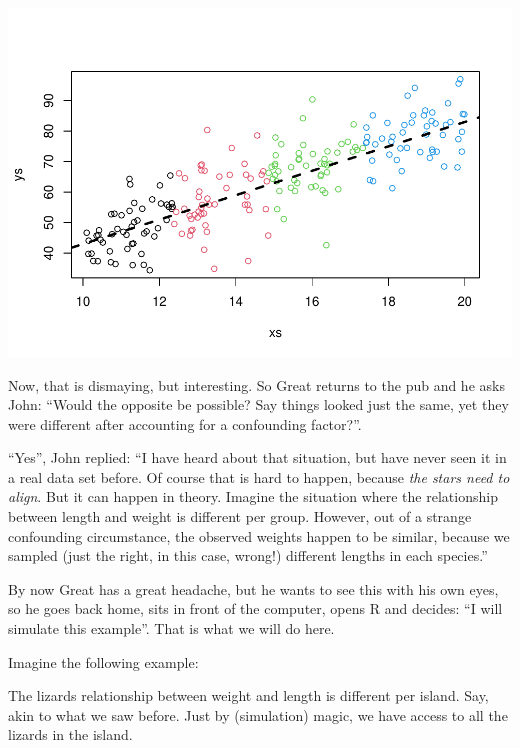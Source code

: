 \documentclass[
]{book}
\begin{document}
\includegraphics{ECOMODbook_files/figure-latex/a10.8-1.pdf}

Now, that is dismaying, but interesting. So Great returns to the pub and he asks John: ``Would the opposite be possible? Say things looked just the same, yet they were different after accounting for a confounding factor?''.

``Yes'', John replied: ``I have heard about that situation, but have never seen it in a real data set before. Of course that is hard to happen, because \emph{the stars need to align}. But it can happen in theory. Imagine the situation where the relationship between length and weight is different per group. However, out of a strange confounding circumstance, the observed weights happen to be similar, because we sampled (just the right, in this case, wrong!) different lengths in each species.''

By now Great has a great headache, but he wants to see this with his own eyes, so he goes back home, sits in front of the computer, opens R and decides: ``I will simulate this example''. That is what we will do here.

Imagine the following example:

The lizards relationship between weight and length is different per island. Say, akin to what we saw before. Just by (simulation) magic, we have access to all the lizards in the island.
\end{document}
